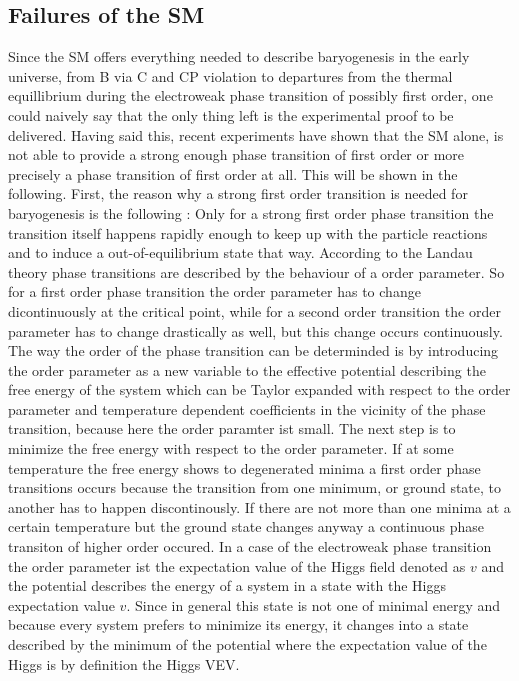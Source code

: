 \subsection{Failures of the SM}
Since the SM offers everything needed to describe baryogenesis in the early universe, from B via C and CP violation to departures from the thermal equillibrium during the electroweak phase transition of possibly first order, one could naively say that the only thing left is the experimental proof to be delivered. \newline\indent
Having said this, recent experiments have shown that the SM alone, is not able to provide a strong enough phase transition of first order or more precisely a phase transition of first order at all. This will be shown in the following. \newline\indent
First, the reason why a strong first order transition is needed for baryogenesis is the following \cite[p. 25]{Bernreuther:2002uj}: Only for a strong first order phase transition the transition itself happens rapidly enough to keep up with the particle reactions and to induce a out-of-equilibrium state that way.\newline\indent
According to the Landau theory phase transitions are described by the behaviour of a order parameter. So for a first order phase transition the order parameter has to change dicontinuously at the critical point, while for a second order transition the order parameter has to change drastically as well, but this change occurs continuously. The way the order of the phase transition can be determinded is by introducing the order parameter as a new variable to the effective potential describing the free energy of the system which can be Taylor expanded with respect to the order parameter and temperature dependent coefficients in the vicinity of the phase transition, because here the order paramter ist small. The next step is to minimize the free energy with respect to the order parameter. If at some temperature the free energy shows to degenerated minima a first order phase transitions occurs because the transition from one minimum, or ground state, to another has to happen discontinously. If there are not more than one minima at a certain temperature but the ground state changes anyway a continuous phase transiton of higher order occured. 
\newline \indent
In a case of the electroweak phase transition the order parameter ist the expectation value of the Higgs field denoted as $v$ and the potential describes the energy of a system in a state with the Higgs expectation value $v$. Since in general this state is not one of minimal energy and because every system prefers to minimize its energy, it changes into a state described by the minimum of the potential where the expectation value of the Higgs is by definition the Higgs VEV. \newline\indent
